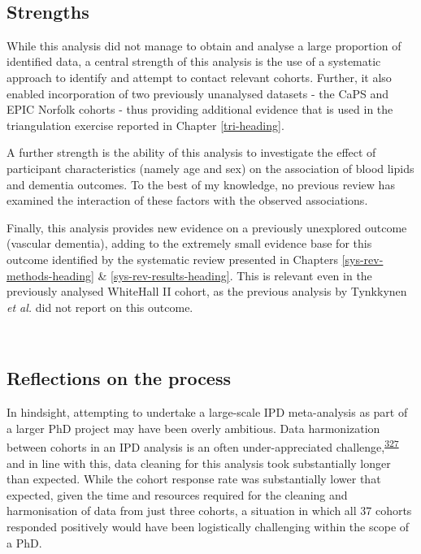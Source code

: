 \documentclass[a4paper, twoside]{templates/ociamthesis}
\begin{document}
~

\hypertarget{strengths-1}{%
\subsection{Strengths}\label{strengths-1}}

While this analysis did not manage to obtain and analyse a large proportion of identified data, a central strength of this analysis is the use of a systematic approach to identify and attempt to contact relevant cohorts. Further, it also enabled incorporation of two previously unanalysed datasets - the CaPS and EPIC Norfolk cohorts - thus providing additional evidence that is used in the triangulation exercise reported in Chapter \ref{tri-heading}.

A further strength is the ability of this analysis to investigate the effect of participant characteristics (namely age and sex) on the association of blood lipids and dementia outcomes. To the best of my knowledge, no previous review has examined the interaction of these factors with the observed associations.

Finally, this analysis provides new evidence on a previously unexplored outcome (vascular dementia), adding to the extremely small evidence base for this outcome identified by the systematic review presented in Chapters \ref{sys-rev-methods-heading} \& \ref{sys-rev-results-heading}. This is relevant even in the previously analysed WhiteHall II cohort, as the previous analysis by Tynkkynen \emph{et al.} did not report on this outcome.

~

\hypertarget{reflections-on-the-process}{%
\subsection{Reflections on the process}\label{reflections-on-the-process}}

In hindsight, attempting to undertake a large-scale IPD meta-analysis as part of a larger PhD project may have been overly ambitious. Data harmonization between cohorts in an IPD analysis is an often under-appreciated challenge,\textsuperscript{\protect\hyperlink{ref-levis2021}{327}} and in line with this, data cleaning for this analysis took substantially longer than expected. While the cohort response rate was substantially lower that expected, given the time and resources required for the cleaning and harmonisation of data from just three cohorts, a situation in which all 37 cohorts responded positively would have been logistically challenging within the scope of a PhD.
\end{document}
